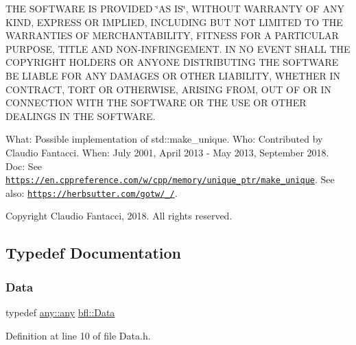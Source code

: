 T\+HE S\+O\+F\+T\+W\+A\+RE IS P\+R\+O\+V\+I\+D\+ED \char`\"{}\+A\+S I\+S\char`\"{}, W\+I\+T\+H\+O\+UT W\+A\+R\+R\+A\+N\+TY OF A\+NY K\+I\+ND, E\+X\+P\+R\+E\+SS OR I\+M\+P\+L\+I\+ED, I\+N\+C\+L\+U\+D\+I\+NG B\+UT N\+OT L\+I\+M\+I\+T\+ED TO T\+HE W\+A\+R\+R\+A\+N\+T\+I\+ES OF M\+E\+R\+C\+H\+A\+N\+T\+A\+B\+I\+L\+I\+TY, F\+I\+T\+N\+E\+SS F\+OR A P\+A\+R\+T\+I\+C\+U\+L\+AR P\+U\+R\+P\+O\+SE, T\+I\+T\+LE A\+ND N\+O\+N-\/\+I\+N\+F\+R\+I\+N\+G\+E\+M\+E\+NT. IN NO E\+V\+E\+NT S\+H\+A\+LL T\+HE C\+O\+P\+Y\+R\+I\+G\+HT H\+O\+L\+D\+E\+RS OR A\+N\+Y\+O\+NE D\+I\+S\+T\+R\+I\+B\+U\+T\+I\+NG T\+HE S\+O\+F\+T\+W\+A\+RE BE L\+I\+A\+B\+LE F\+OR A\+NY D\+A\+M\+A\+G\+ES OR O\+T\+H\+ER L\+I\+A\+B\+I\+L\+I\+TY, W\+H\+E\+T\+H\+ER IN C\+O\+N\+T\+R\+A\+CT, T\+O\+RT OR O\+T\+H\+E\+R\+W\+I\+SE, A\+R\+I\+S\+I\+NG F\+R\+OM, O\+UT OF OR IN C\+O\+N\+N\+E\+C\+T\+I\+ON W\+I\+TH T\+HE S\+O\+F\+T\+W\+A\+RE OR T\+HE U\+SE OR O\+T\+H\+ER D\+E\+A\+L\+I\+N\+GS IN T\+HE S\+O\+F\+T\+W\+A\+RE.

What\+: Possible implementation of std\+::make\+\_\+unique. Who\+: Contributed by Claudio Fantacci. When\+: July 2001, April 2013 -\/ May 2013, September 2018. Doc\+: See \href{https://en.cppreference.com/w/cpp/memory/unique_ptr/make_unique}{\tt https\+://en.\+cppreference.\+com/w/cpp/memory/unique\+\_\+ptr/make\+\_\+unique}. See also\+: \href{https://herbsutter.com/gotw/_102/}{\tt https\+://herbsutter.\+com/gotw/\+\_/}.

Copyright Claudio Fantacci, 2018. All rights reserved. 

\subsection{Typedef Documentation}
\mbox{\label{namespacebfl_af6b103c6821db1b54452f776fdd9dd02}} 
\subsubsection{\texorpdfstring{Data}{Data}}
{\footnotesize\ttfamily typedef \mbox{\hyperlink{classbfl_1_1any_1_1any}{any\+::any}} \mbox{\hyperlink{namespacebfl_af6b103c6821db1b54452f776fdd9dd02}{bfl\+::\+Data}}}



Definition at line 10 of file Data.\+h.

\mbox{\label{namespacebfl_aeab050cf5b080512a10c1fec72921f0c}} 
